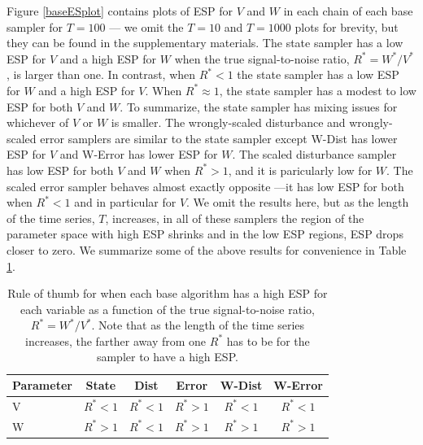 \documentclass{article}
\begin{document}
Figure \ref{baseESplot} contains plots of ESP for $V$ and $W$ in each chain of each base sampler for $T=100$ --- we omit the $T=10$ and $T=1000$ plots for brevity, but they can be found in the supplementary materials. The state sampler has a low ESP for $V$ and a high ESP for $W$ when the true signal-to-noise ratio, $R^*=W^*/V^*$, is larger than one. In contrast, when $R^*<1$ the state sampler has a low ESP for $W$ and a high ESP for $V$. When $R^*\approx 1$, the state sampler has a modest to low ESP for both $V$ and $W$. To summarize, the state sampler has mixing issues for whichever of $V$ or $W$ is smaller. The wrongly-scaled disturbance and wrongly-scaled error samplers are similar to the state sampler except W-Dist has lower ESP for $V$ and W-Error has lower ESP for $W$. The scaled disturbance sampler has low ESP for both $V$ and $W$ when $R^*>1$, and it is paricularly low for $W$. The scaled error sampler behaves almost exactly opposite ---it has low ESP for both when $R^*<1$ and in particular for $V$. We omit the results here, but as the length of the time series, $T$, increases, in all of these samplers the region of the parameter space with high ESP shrinks and in the low ESP regions, ESP drops closer to zero. We summarize some of the above results for convenience in Table \ref{tab:stnmix}.
\begin{table}
  \centering
  \begin{tabular}{|l|ccccc|}\hline
    Parameter & State & Dist & Error & W-Dist & W-Error \\\hline
    V & $R^* < 1$ & $R^* < 1$ & $R^* > 1$ & $R^* < 1$ & $R^* < 1$\\
    W & $R^* > 1$ & $R^* < 1$ & $R^* > 1$ & $R^* > 1$ & $R^* > 1$ \\\hline
  \end{tabular}
  \caption{Rule of thumb for when each base algorithm has a high ESP for each variable as a function of the true signal-to-noise ratio, $R^*=W^*/V^*$. Note that as the length of the time series increases, the farther away from one $R^*$ has to be for the sampler to have a high ESP.}
  \label{tab:stnmix}
\end{table}
\end{document}

